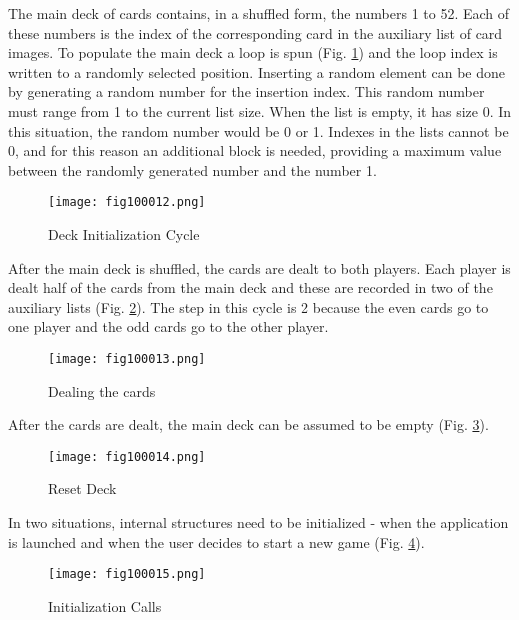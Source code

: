 The main deck of cards contains, in a shuffled form, the numbers 1 to 52. Each of these numbers is the index of the corresponding card in the auxiliary list of card images. To populate the main deck a loop is spun (Fig. \ref{fig100012}) and the loop index is written to a randomly selected position. Inserting a random element can be done by generating a random number for the insertion index. This random number must range from 1 to the current list size. When the list is empty, it has size 0. In this situation, the random number would be 0 or 1. Indexes in the lists cannot be 0, and for this reason an additional block is needed, providing a maximum value between the randomly generated number and the number 1.

\begin{figure}[H]
   \centering
   \texttt{[image: fig100012.png]}
   \caption{Deck Initialization Cycle}
\label{fig100012}
\end{figure}

After the main deck is shuffled, the cards are dealt to both players. Each player is dealt half of the cards from the main deck and these are recorded in two of the auxiliary lists (Fig. \ref{fig100013}). The step in this cycle is 2 because the even cards go to one player and the odd cards go to the other player.

\begin{figure}[H]
   \centering
   \texttt{[image: fig100013.png]}
   \caption{Dealing the cards}
\label{fig100013}
\end{figure}

After the cards are dealt, the main deck can be assumed to be empty (Fig. \ref{fig100014}).

\begin{figure}[H]
   \centering
   \texttt{[image: fig100014.png]}
   \caption{Reset Deck}
\label{fig100014}
\end{figure}

In two situations, internal structures need to be initialized - when the application is launched and when the user decides to start a new game (Fig. \ref{fig100015}).

\begin{figure}[H]
   \centering
   \texttt{[image: fig100015.png]}
   \caption{Initialization Calls}
\label{fig100015}
\end{figure}

